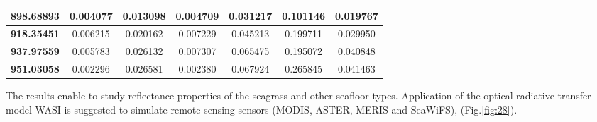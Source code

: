 \documentclass[10pt, a4paper]{article}
\begin{document}
\begin{table}[htbp]
\begin{center}
\begin{tabular}{|c|c|c|c|c|c|c|}
		\textbf{898.68893} & 0.004077 & 0.013098 & 0.004709 & 0.031217 & 0.101146 & 0.019767 \\ \hline
		\textbf{918.35451} & 0.006215 & 0.020162 & 0.007229 & 0.045213 & 0.199711 & 0.029950 \\ \hline
		\textbf{937.97559} & 0.005783 & 0.026132 & 0.007307 & 0.065475 & 0.195072 & 0.040848 \\ \hline
		\textbf{951.03058} & 0.002296 & 0.026581 & 0.002380 & 0.067924 & 0.265845 & 0.041463 \\ \hline
	\end{tabular}
	\end{center}
	\label{tab:2}
\end{table}

The results enable to study reflectance properties of the seagrass and other
seafloor types. Application of the optical radiative transfer model WASI is suggested to simulate
remote sensing sensors (MODIS, ASTER, MERIS and SeaWiFS), (Fig.\ref{fig:28}).
\end{document}
